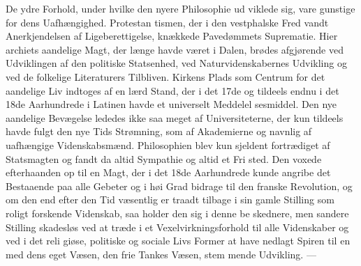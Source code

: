 \documentclass[12pt,a4paper]{book}
\begin{document}
De ydre Forhold, under hvilke den nyere Philosophie ud\-%
viklede sig, vare gunstige for dens Uafhængighed. Protestan\-%
tismen, der i den vestphalske Fred vandt Anerkjendelsen af
Ligeberettigelse, knækkede Pavedømmets Suprematie. Hier\-%
archiets aandelige Magt, der længe havde været i Dalen, brødes
afgjørende ved Udviklingen af den politiske Statsenhed, ved
Naturvidenskabernes Udvikling og ved de folkelige Literaturers
Tilbliven. Kirkens Plads som Centrum for det aandelige Liv
indtoges af en lærd Stand, der i det 17de og tildeels endnu i
det 18de Aarhundrede i Latinen havde et universelt Meddelel\-%
sesmiddel. Den nye aandelige Bevægelse lededes ikke saa
meget af Universiteterne, der kun tildeels havde fulgt den nye
Tids Strømning, som af Akademierne og navnlig af uafhængige
Videnskabsmænd. Philosophien blev kun sjeldent fortrædiget
af Statsmagten og fandt da altid Sympathie og altid et Fri\-%
sted. Den voxede efterhaanden op til en Magt, der i det 18de
Aarhundrede kunde angribe det Bestaaende paa alle Gebeter
og i høi Grad bidrage til den franske Revolution, og om den
end efter den Tid væsentlig er traadt tilbage i sin gamle Stilling
som roligt forskende Videnskab, saa holder den sig i denne be\-%
skednere, men sandere Stilling skadesløs ved at træde i et
Vexelvirkningsforhold til alle Videnskaber og ved i det reli\-%
giøse, politiske og sociale Livs Former at have nedlagt Spiren
til en med dens eget Væsen, den frie Tankes Væsen, stem\-%
mende Udvikling. ---
\end{document}
